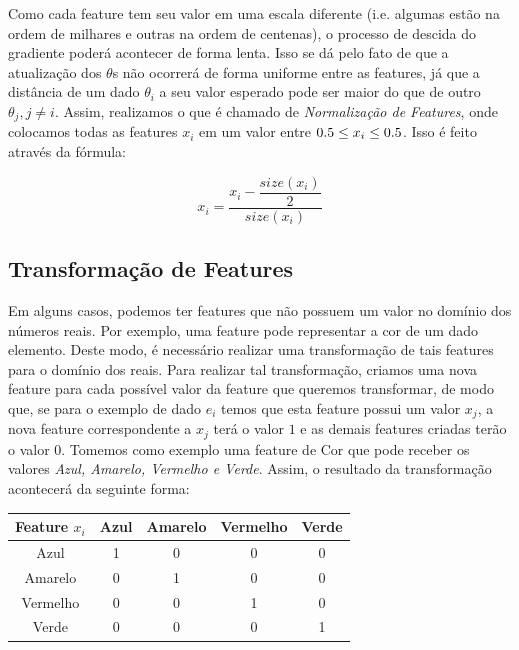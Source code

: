 \documentclass[conference]{IEEEtran}
\begin{document}
Como cada feature tem seu valor em uma escala diferente (i.e. algumas estão na ordem de milhares e outras na ordem de centenas), o processo de descida do gradiente poderá acontecer de forma lenta. Isso se dá pelo fato de que a atualização dos $\theta$s não ocorrerá de forma uniforme entre as features, já que a distância de um dado $\theta_{i}$ a seu valor esperado pode ser maior do que de outro $\theta_{j}, j \neq i$. Assim, realizamos o que é chamado de \textit{Normalização de Features}, onde colocamos todas as features $x_{i}$ em um valor entre $ \-0.5 \leq x_{i} \leq 0.5$. Isso é feito através da fórmula:

\begin{equation} \label{eq:feature_norm}
x_{i} = \dfrac{x_{i} - \dfrac{size(x_{i})}{2}}{size(x_{i})}
\end{equation}

\subsection{Transformação de Features}

Em alguns casos, podemos ter features que não possuem um valor no domínio dos números reais. Por exemplo, uma feature pode representar a cor de um dado elemento. Deste modo, é necessário realizar uma transformação de tais features para o domínio dos reais. Para realizar tal transformação, criamos uma nova feature para cada possível valor da feature que queremos transformar, de modo que, se para o exemplo de dado $e_{i}$ temos que esta feature possui um valor $x_{j}$, a nova feature correspondente a $x_{j}$ terá o valor $1$ e as demais features criadas terão o valor $0$. Tomemos como exemplo uma feature de Cor que pode receber os valores \textit{Azul, Amarelo, Vermelho e Verde}. Assim, o resultado da transformação acontecerá da seguinte forma:

\begin{table}[H]
\centering
\begin{tabular}{|c|c|c|c|c|}
\hline
Feature $x_{i}$ & Azul & Amarelo & Vermelho & Verde \\ \hline
Azul            & 1    & 0       & 0        & 0     \\ \hline
Amarelo         & 0    & 1       & 0        & 0     \\ \hline
Vermelho        & 0    & 0       & 1        & 0     \\ \hline
Verde           & 0    & 0       & 0        & 1     \\ \hline
\end{tabular}
\end{table}
\end{document}
